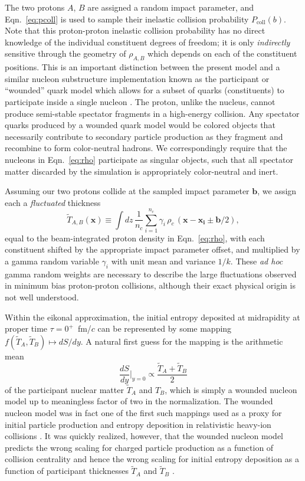 \documentclass[aps,prc,reprint,amsmath,nofootinbib]{revtex4-1}
\newcommand{\T}{\tilde{T}}
\newcommand{\x}{\mathbf x}
\begin{document}
The two protons $A$, $B$ are assigned a random impact parameter, and Eqn.~\eqref{eq:pcoll} is used to sample their inelastic collision probability $P_\mathrm{coll}(b)$.
Note that this proton-proton inelastic collision probability has no direct knowledge of the individual constituent degrees of freedom; it is only \emph{indirectly} sensitive through the geometry of $\rho_{A, B}$ which depends on each of the constituent positions.
This is an important distinction between the present model and a similar nucleon substructure implementation known as the participant or ``wounded'' quark model which allows for a subset of quarks (constituents) to participate inside a single nucleon \cite{ANISOVICH1978477, Broniowski:2016pvx}.
The proton, unlike the nucleus, cannot produce semi-stable spectator fragments in a high-energy collision.
Any spectator quarks produced by a wounded quark model would be colored objects that necessarily contribute to secondary particle production as they fragment and recombine to form color-neutral hadrons.
We correspondingly require that the nucleons in Eqn.~\eqref{eq:rho} participate as singular objects, such that all spectator matter discarded by the simulation is appropriately color-neutral and inert.

Assuming our two protons collide at the sampled impact parameter $\mathbf{b}$, we assign each a \emph{fluctuated} thickness
\begin{equation}
  \label{eq:fluctuated_thick}
  \T_{A, B}(\x) \equiv \int dz\, \frac{1}{n_c} \sum\limits_{i=1}^{n_c} \gamma_i\, \rho_c \,(\mathbf{x} - \mathbf{x_i} \pm \mathbf{b}/2),
\end{equation}
equal to the beam-integrated proton density in Eqn.~\eqref{eq:rho}, with each constituent shifted by the appropriate impact parameter offset, and multiplied by a gamma random variable $\gamma_i$ with unit mean and variance $1/k$.
These \emph{ad hoc} gamma random weights are necessary to describe the large fluctuations observed in minimum bias proton-proton collisions, although their exact physical origin is not well understood.

Within the eikonal approximation, the initial entropy deposited at midrapidity at proper time $\tau=0^+$~fm/$c$ can be represented by some mapping ${f(\T_A, \T_B) \mapsto dS/dy}$.
A natural first guess for the mapping is the arithmetic mean
\begin{equation}
  \frac{dS}{dy}\bigg\vert_{y=0} \propto \frac{\T_A + \T_B}{2}
\end{equation}
of the participant nuclear matter $\T_A$ and $T_B$, which is simply a wounded nucleon model up to meaningless factor of two in the normalization.
The wounded nucleon model was in fact one of the first such mappings used as a proxy for initial particle production and entropy deposition in relativistic heavy-ion collisions \cite{Bialas:1976ed}.
It was quickly realized, however, that the wounded nucleon model predicts the wrong scaling for charged particle production as a function of collision centrality and hence the wrong scaling for initial entropy deposition as a function of participant thicknesses $\T_A$ and $\T_B$ \cite{Kharzeev:2000ph}.
\end{document}
